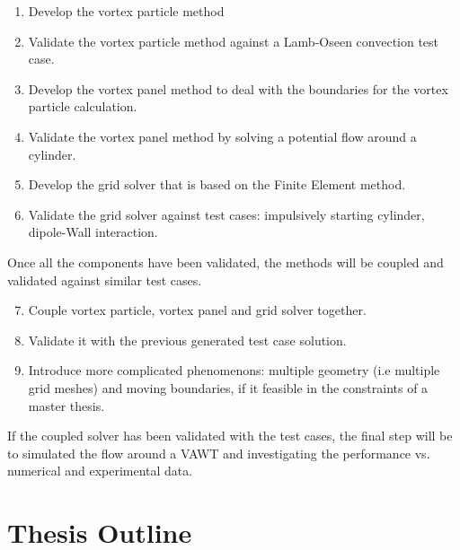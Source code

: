 	\begin{enumerate}
	\item Develop the vortex particle method
	\item Validate the vortex particle method against a Lamb-Oseen convection test case.
	\item Develop the vortex panel method to deal with the boundaries for the vortex particle calculation. 
	\item Validate the vortex panel method by solving a potential flow around a cylinder.
	\item Develop the grid solver that is based on the Finite Element method. 
	\item Validate the grid solver against test cases: impulsively starting cylinder, dipole-Wall interaction.
	\end{enumerate}

Once all the components have been validated, the methods will be coupled and validated against similar test cases.

	\begin{enumerate}
	\setcounter{enumi}{6}
	\item Couple vortex particle, vortex panel and grid solver together.
	\item Validate it with the previous generated test case solution.
	\item Introduce more complicated phenomenons: multiple geometry (i.e multiple grid meshes) and moving boundaries, if it feasible in the constraints of a master thesis.
	\end{enumerate}

If the coupled solver has been validated with the test cases, the final step will be to simulated the flow around a VAWT and investigating the performance vs. numerical and experimental data.

\section{Thesis Outline}


%
%
%
%

